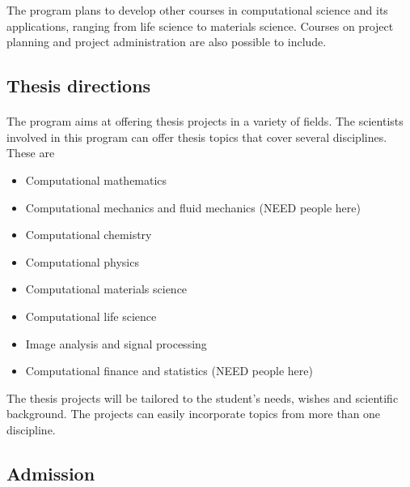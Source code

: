 \documentclass[%
oneside,                 %
final,                   %
10pt]{article}
\begin{document}
\noindent
The program plans to develop other courses in computational science and its applications, ranging from life science to materials science.
Courses on project planning and project administration are also possible to include.





\subsection*{Thesis directions}

\paragraph{}
The program aims at offering thesis projects in a variety of fields. The scientists involved in this program can offer thesis
topics that cover several disciplines. These are

\begin{itemize}
\item Computational mathematics

\item Computational mechanics and fluid mechanics  (NEED people here)

\item Computational chemistry

\item Computational physics

\item Computational materials science

\item Computational life science

\item Image analysis and signal processing

\item Computational finance and statistics   (NEED people here)
\end{itemize}

\noindent
The thesis projects will be tailored to the student's needs, wishes and scientific background. The projects can easily incorporate topics from more than one discipline.







\subsection*{Admission}
\end{document}
